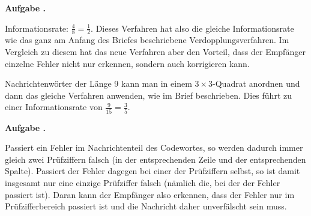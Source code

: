 \documentclass[a4paper,ngerman,12pt]{scrartcl}
\theoremstyle{definition}
\theoremstyle{plain}
\theoremstyle{remark}
\newlength{\aufgabenskip}
\newcounter{aufgabennummer}
\newenvironment{aufgabe}[1]{
	\addtocounter{aufgabennummer}{1}
	\textbf{Aufgabe \theaufgabennummer.} \emph{#1} \par
}{\vspace{\aufgabenskip}}
\begin{document}
\begin{aufgabe}{}
	Informationsrate: $\frac{4}{8}=\frac{1}{2}$. Dieses Verfahren hat also die gleiche Informationsrate wie das ganz am Anfang des Briefes beschriebene Verdopplungsverfahren. Im Vergleich zu diesem hat das neue Verfahren aber den Vorteil, dass der Empfänger einzelne Fehler nicht nur erkennen, sondern auch korrigieren kann.
	
	Nachrichtenwörter der Länge 9 kann man in einem $3\times 3$-Quadrat anordnen und dann das gleiche Verfahren anwenden, wie im Brief beschrieben. Dies führt zu einer Informationsrate von $\frac{9}{15}=\frac{3}{5}$.
\end{aufgabe}

\begin{aufgabe}{}
	Passiert ein Fehler im Nachrichtenteil des Codewortes, so werden dadurch immer gleich zwei Prüfziffern falsch (in der entsprechenden Zeile und der entsprechenden Spalte). Passiert der Fehler dagegen bei einer der Prüfziffern selbst, so ist damit insgesamt nur eine einzige Prüfziffer falsch (nämlich die, bei der der Fehler passiert ist). Daran kann der Empfänger also erkennen, dass der Fehler nur im Prüfzifferbereich passiert ist und die Nachricht daher unverfälscht sein muss.
\end{aufgabe}
\end{document}
